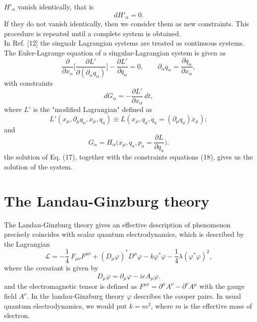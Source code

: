 \documentclass[12pt]{article}
\begin{document}
$H'_{\alpha}$ vanish identically, that is
\begin{equation}\label{16}
dH'_{\alpha}=0.
\end{equation}
If they do not vanish identically, then we consider them as new
constraints. This procedure is repeated until a complete system is
obtained.\\
 \indent In Ref. [12] the singualr Lagrangian systems are
treated as continuous systems. The Euler-Lagrange equation of a
singular-Lagrangian system is given as
\begin{equation}\label{17}
\frac{\partial }{\partial x_{\alpha}}\bigg[\frac{\partial
L'}{\partial (\partial_{\alpha}q_{\alpha})}\bigg]-\frac{\partial
L'}{\partial
q_{\alpha}}=0,\qquad\partial_{\alpha}q_{\alpha}=\frac{\partial
q_{\alpha}}{\partial x_{\alpha}},
\end{equation}
with constraints
\begin{equation}\label{18}
dG_{\alpha}=-\frac{\partial L'}{\partial x_{\alpha}}\,dt,
\end{equation}
where $L'$ is the "modified Lagrangian" defined as
\begin{equation}\label{19}
L'(x_{\mu},\partial_{\mu}q_{a},\dot{x}_{\mu},q_{a})\equiv
L(x_{\mu},q_{a},\dot{q}_{a}=(\partial_{\mu} q_{a})\dot{x}_{\mu});
\end{equation}
and
\begin{equation}\label{20}
G_{\alpha}=H_{\alpha}\bigg(x_{\mu},q_{a},p_{a}=\frac{\partial
L}{\partial q_{a}}\bigg).
\end{equation}
the solution of Eq. (17), together with the constraints equations
(18), gives us the solution of the system.

\section{The Landau-Ginzburg theory}
\indent The Landau-Ginzburg theory gives an effective
description of phenomenon precisely coincides with scalar quantum
electrodynamics, which is described by the Lagrangian
\begin{equation}\label{21}
\mathcal{L}=-\frac{1}{4}\>F_{\mu\nu} F^{\mu\nu}+
(D_{\mu}\varphi)^\ast D^{\mu}\varphi-k \varphi^{\ast}
\varphi-\frac{1}{4}\lambda (\varphi^{\ast} \varphi)^2,
\end{equation}
where the covariant is given by
\begin{equation}\label{22}
D_{\mu}\varphi=\partial_{\mu}\varphi-ieA_{\mu}\varphi.
\end{equation}
and the electromagnetic tensor is defined as $F^{\mu\nu}=\partial^{\mu} A^{\nu}-\partial^\nu A^\mu$ with the gauge field $A^\nu$. 
In the landau-Ginzburg theory $\varphi$ describes the cooper
pairs. In usual quantum electrodynamics, we would put $k=m^2$,
where $m$ is the effective mass of electron.\\
\end{document}

